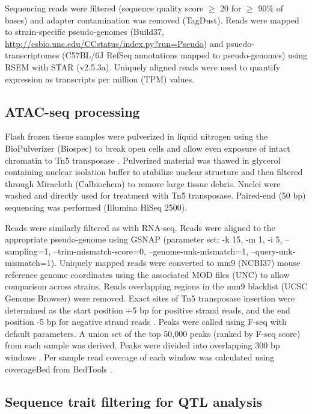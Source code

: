\documentclass[10pt,letterpaper]{article}
\begin{document}
Sequencing reads were filtered (sequence quality score $\ge$ 20 for $\ge$ 90\% of bases) and adapter contamination was removed (TagDust). Reads were mapped to strain-specific pseudo-genomes (Build37, \url{http://csbio.unc.edu/CCstatus/index.py?run=Pseudo}) and psuedo-transcriptomes (C57BL/6J RefSeq annotations mapped to pseudo-genomes) using RSEM with STAR (v2.5.3a). Uniquely aligned reads  were used to quantify expression as transcripts per million (TPM) values.

\subsection*{ATAC-seq processing}

Flash frozen tissue samples were pulverized in liquid nitrogen using the BioPulverizer (Biospec) to break open cells and allow even exposure of intact chromatin to Tn5 transposase \cite{Buenrostro2015}. Pulverized material was thawed in glycerol containing nuclear isolation buffer to stabilize nuclear structure and then filtered through Miracloth (Calbiochem) to remove large tissue debris. Nuclei were washed and directly used for treatment with Tn5 transposase. Paired-end (50 bp) sequencing was performed (Illumina HiSeq 2500).

Reads were similarly filtered as with RNA-seq. Reads were aligned to the appropriate pseudo-genome using GSNAP (parameter set: -k 15, -m 1, -i 5, –sampling=1, –trim-mismatch-score=0, –genome-unk-mismatch=1, –query-unk-mismatch=1). Uniquely mapped reads were converted to mm9 (NCBI37) mouse reference genome coordinates using the associated MOD files (UNC) to allow comparison across strains. Reads overlapping regions in the mm9 blacklist (UCSC Genome Browser) were removed. Exact sites of Tn5 transposase insertion were determined as the start position +5 bp for positive strand reads, and the end position -5 bp for negative strand reads \cite{Buenrostro2013}. Peaks were called using F-seq with default parameters. A union set of the top 50,000 peaks (ranked by F-seq score) from each sample was derived. Peaks were divided into overlapping 300 bp windows \cite{Shibata2012}. Per sample read coverage of each window was calculated using coverageBed from BedTools \cite{Quinlan2010}.

\subsection*{Sequence trait filtering for QTL analysis}
\end{document}
